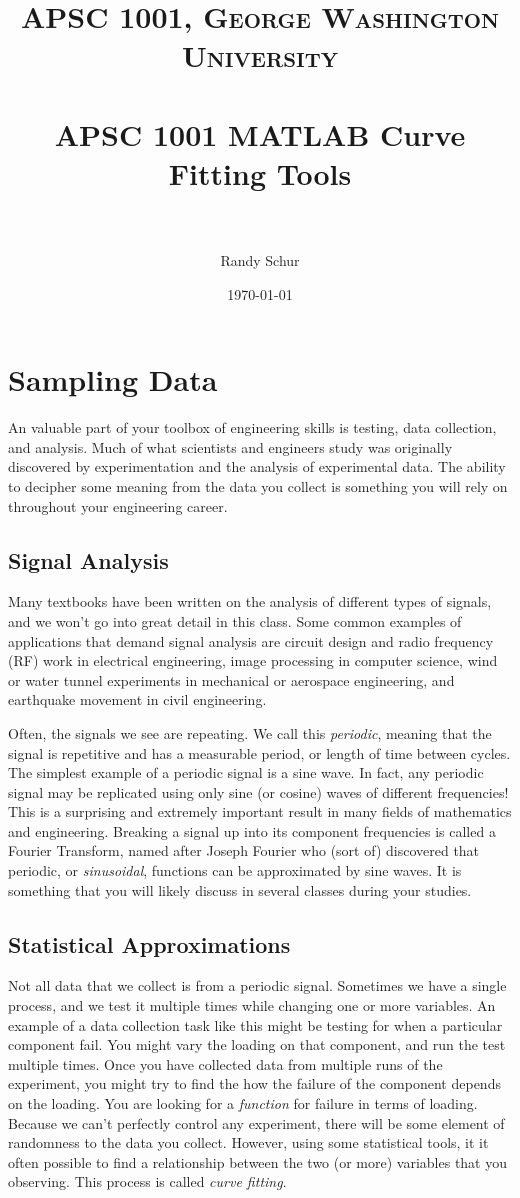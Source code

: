 \documentclass[paper=a4, fontsize=11pt]{scrartcl} %
\title{	
\normalfont \normalsize 
\textsc{APSC 1001, George Washington University} \\ [25pt] %
\horrule{0.5pt} \\[0.4cm] %
\huge APSC 1001 MATLAB Curve Fitting Tools \\ %
\horrule{2pt} \\[0.5cm] %
}
\author{\normalsize Randy Schur } %
\date{\normalsize \today } %
\numberwithin{equation}{section} %
\numberwithin{figure}{section} %
\numberwithin{table}{section} %
\begin{document}
\maketitle %

\section{Sampling Data}
An valuable part of your toolbox of engineering skills is testing, data collection, and analysis.
Much of what scientists and engineers study was originally discovered by experimentation and the analysis of experimental data.
The ability to decipher some meaning from the data you collect is something you will rely on throughout your engineering career. 

\subsection{Signal Analysis}
Many textbooks have been written on the analysis of different types of signals, and we won't go into great detail in this class.
Some common examples of applications that demand signal analysis are circuit design and radio frequency (RF) work in electrical engineering, image processing in computer science, wind or water tunnel experiments in mechanical or aerospace engineering, and earthquake movement in civil engineering. 

Often, the signals we see are repeating. 
We call this \textit{periodic}, meaning that the signal is repetitive and has a measurable period, or length of time between cycles.
The simplest example of a periodic signal is a sine wave. 
In fact, any periodic signal may be replicated using only sine (or cosine) waves of different frequencies!
This is a surprising and extremely important result in many fields of mathematics and engineering. 
Breaking a signal up into its component frequencies is called a Fourier Transform, named after Joseph Fourier who (sort of) discovered that periodic, or \textit{sinusoidal}, functions can be approximated by sine waves.
It is something that you will likely discuss in several classes during your studies.  

\subsection{Statistical Approximations}
Not all data that we collect is from a periodic signal. Sometimes we have a single process, and we test it multiple times while changing one or more variables. 
An example of a data collection task like this might be testing for when a particular component fail. 
You might vary the loading on that component, and run the test multiple times. 
Once you have collected data from multiple runs of the experiment, you might try to find the how the failure of the component depends on the loading. 
You are looking for a \textit{function} for failure in terms of loading. 
Because we can't perfectly control any experiment, there will be some element of randomness to the data you collect. 
However, using some statistical tools, it it often possible to find a relationship between the two (or more) variables that you observing.
This process is called \textit{curve fitting}.
\end{document}
